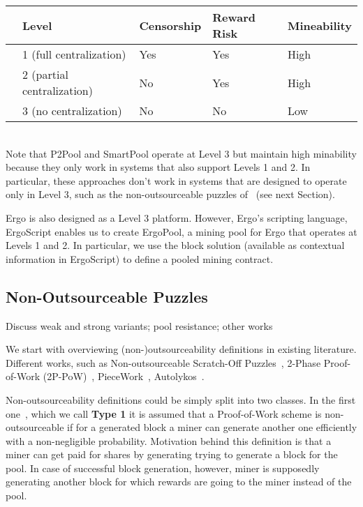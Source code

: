 \documentclass[11pt]{article}
\newcommand{\langname}{ErgoScript\xspace}
\newcommand{\poolname}{ErgoPool\xspace}
\begin{document}
	\begin{tabular}{lllll}
		& Level & Censorship & Reward Risk & Mineability \\\hline
		& 1 (full centralization)    & Yes & Yes & High \\
		& 2 (partial centralization)    & No & Yes & High \\
		& 3 (no centralization)    & No & No & Low
	\end{tabular}

~\\

Note that P2Pool and SmartPool operate at Level 3 but maintain high minability because they only work in systems that also support Levels  1 and 2. In particular, these approaches don't work in systems that are designed to operate only in Level 3, such as the non-outsourceable puzzles of~\cite{} (see next Section). 

Ergo is also designed as a Level 3 platform. However, Ergo's scripting language, \langname enables us to create \poolname, a mining pool for Ergo that operates at Levels 1 and 2. In particular, we use the block solution (available as contextual information in \langname) to define a pooled mining contract.

\subsection{Non-Outsourceable Puzzles}

Discuss weak and strong variants; pool resistance; other works

We start with overviewing (non-)outsourceability definitions in existing literature. Different works, such as
Non-outsourceable Scratch-Off Puzzles~\cite{miller2015nonoutsourceable}, 2-Phase Proof-of-Work (2P-PoW)~\cite{twophase},
PieceWork~\cite{daian2017short}, Autolykos~\cite{autolykos}.


Non-outsourceability definitions could be simply split into two classes. In the first one~\cite{miller2015nonoutsourceable}, which we call \textbf{Type 1} it is assumed that a Proof-of-Work scheme is non-outsourceable if for a generated block a miner can generate another one
efficiently with a non-negligible probability. Motivation behind this definition is that a miner can get paid for shares
by generating trying to generate a block for the pool. In case of successful block generation, however, miner is supposedly generating
another block for which rewards are going to the miner instead of the pool. 
\end{document}
